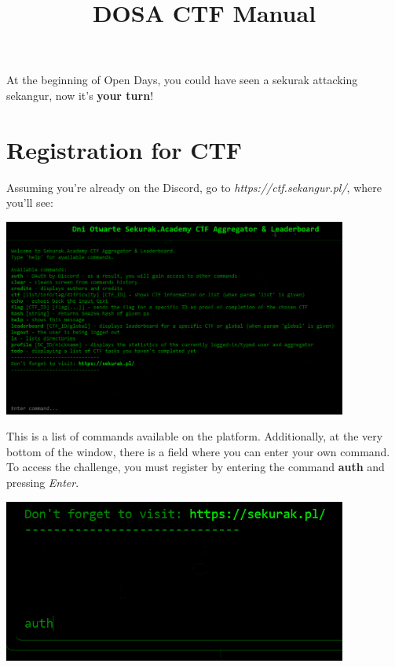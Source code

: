 \documentclass{article}
\title{\textbf{DOSA CTF Manual}}
\author{}
\date{}
\begin{document}
\maketitle

At the beginning of Open Days, you could have seen a sekurak attacking sekangur, now it's \textbf{your turn}!

\section{Registration for CTF}
Assuming you're already on the Discord, go to \textit{https://ctf.sekangur.pl/}, where you'll see:
\begin{center}
    \includegraphics[width=0.85\textwidth]{"image1.png"}
\end{center}

This is a list of commands available on the platform. Additionally, at the very bottom of the window, there is a field where you can enter your own command. To access the challenge, you must register by entering the command \textbf{auth} and pressing \textit{Enter}.
\begin{center}
    \includegraphics[width=0.85\textwidth]{"image2.png"}
\end{center}
\end{document}

